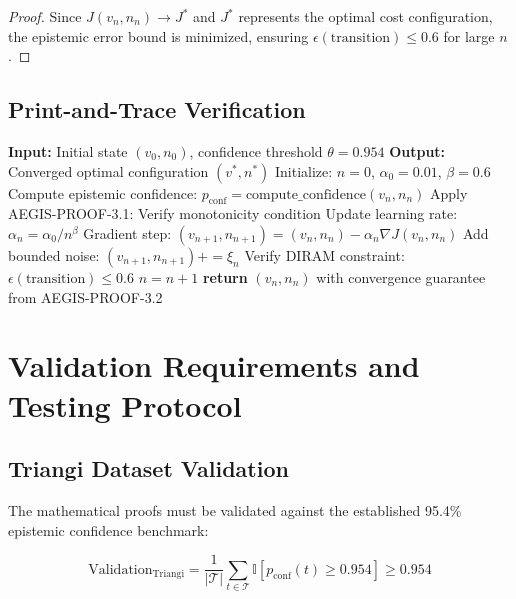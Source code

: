\documentclass[11pt]{article}
\theoremstyle{definition}
\begin{document}
\begin{proof}
Since $J(v_n, n_n) \to J^*$ and $J^*$ represents the optimal cost configuration, the epistemic error bound is minimized, ensuring $\epsilon(\text{transition}) \leq 0.6$ for large $n$.
\end{proof}

\subsection{Print-and-Trace Verification}

\begin{algorithm}
\caption{AEGIS-Verified Hybrid Mode Implementation}
\begin{algorithmic}
\STATE \textbf{Input:} Initial state $(v_0, n_0)$, confidence threshold $\theta = 0.954$
\STATE \textbf{Output:} Converged optimal configuration $(v^*, n^*)$
\STATE 
\STATE Initialize: $n = 0$, $\alpha_0 = 0.01$, $\beta = 0.6$
    \STATE Compute epistemic confidence: $p_{\text{conf}} = \text{compute\_confidence}(v_n, n_n)$
    \STATE Apply AEGIS-PROOF-3.1: Verify monotonicity condition
    \STATE Update learning rate: $\alpha_n = \alpha_0 / n^\beta$
    \STATE Gradient step: $(v_{n+1}, n_{n+1}) = (v_n, n_n) - \alpha_n \nabla J(v_n, n_n)$
    \STATE Add bounded noise: $(v_{n+1}, n_{n+1}) += \xi_n$
    \STATE Verify DIRAM constraint: $\epsilon(\text{transition}) \leq 0.6$
    \STATE $n = n + 1$
\ENDWHILE
\STATE \textbf{return} $(v_n, n_n)$ with convergence guarantee from AEGIS-PROOF-3.2
\end{algorithmic}
\end{algorithm}

\section{Validation Requirements and Testing Protocol}

\subsection{Triangi Dataset Validation}

The mathematical proofs must be validated against the established 95.4\% epistemic confidence benchmark:

\begin{equation}
\text{Validation}_{\text{Triangi}} = \frac{1}{|\mathcal{T}|} \sum_{t \in \mathcal{T}} \mathbb{I}[p_{\text{conf}}(t) \geq 0.954] \geq 0.954
\end{equation}
\end{document}
